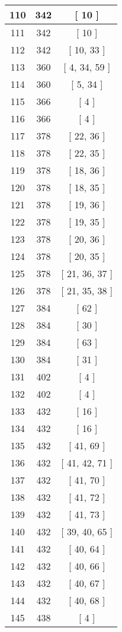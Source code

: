 \begin{center}
\begin{longtable}[H]{|| c c c ||}
\hline
110 & 342 & [ 10 ] \\ 
\hline
111 & 342 & [ 10 ] \\ 
\hline
112 & 342 & [ 10, 33 ] \\ 
\hline
113 & 360 & [ 4, 34, 59 ] \\ 
\hline
114 & 360 & [ 5, 34 ] \\ 
\hline
115 & 366 & [ 4 ] \\ 
\hline
116 & 366 & [ 4 ] \\ 
\hline
117 & 378 & [ 22, 36 ] \\ 
\hline
118 & 378 & [ 22, 35 ] \\ 
\hline
119 & 378 & [ 18, 36 ] \\ 
\hline
120 & 378 & [ 18, 35 ] \\ 
\hline
121 & 378 & [ 19, 36 ] \\ 
\hline
122 & 378 & [ 19, 35 ] \\ 
\hline
123 & 378 & [ 20, 36 ] \\ 
\hline
124 & 378 & [ 20, 35 ] \\ 
\hline
125 & 378 & [ 21, 36, 37 ] \\ 
\hline
126 & 378 & [ 21, 35, 38 ] \\ 
\hline
127 & 384 & [ 62 ] \\ 
\hline
128 & 384 & [ 30 ] \\ 
\hline
129 & 384 & [ 63 ] \\ 
\hline
130 & 384 & [ 31 ] \\ 
\hline
131 & 402 & [ 4 ] \\ 
\hline
132 & 402 & [ 4 ] \\ 
\hline
133 & 432 & [ 16 ] \\ 
\hline
134 & 432 & [ 16 ] \\ 
\hline
135 & 432 & [ 41, 69 ] \\ 
\hline
136 & 432 & [ 41, 42, 71 ] \\ 
\hline
137 & 432 & [ 41, 70 ] \\ 
\hline
138 & 432 & [ 41, 72 ] \\ 
\hline
139 & 432 & [ 41, 73 ] \\ 
\hline
140 & 432 & [ 39, 40, 65 ] \\ 
\hline
141 & 432 & [ 40, 64 ] \\ 
\hline
142 & 432 & [ 40, 66 ] \\ 
\hline
143 & 432 & [ 40, 67 ] \\ 
\hline
144 & 432 & [ 40, 68 ] \\ 
\hline
145 & 438 & [ 4 ] \\ 

\end{longtable}
\end{center}
